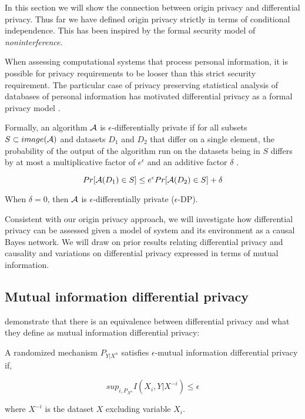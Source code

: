 \documentclass[../thesis.tex]{subfiles}
\begin{document}
In this section we will show the connection between
origin privacy and differential privacy.
Thus far we have defined origin privacy strictly in
terms of conditional independence.
This has been inspired by the formal security model
of \emph{noninterference}.

When assessing computational systems that process
personal information, it is possible for privacy
requirements to be looser than this strict security
requirement.
The particular case of privacy preserving statistical
analysis of databases of personal information has
motivated differential privacy as a formal privacy
model \cite{dwork06icalp,dwork08jpc}. 

Formally, an algorithm $\mathcal{A}$ is $\epsilon$-differentially private
if for all subsets $S \subset image(\mathcal{A})$ and
datasets $D_1$ and $D_2$ that differ on a single element,
the probability of the output of the algorithm run
on the datasets being in $S$ differs by at most a
multiplicative factor of $e^\epsilon$ and an additive
factor $\delta$ \cite{dwork2014algorithmic}. 

\begin{dfn}
$$Pr[\mathcal{A}(D_1) \in S] \leq e^\epsilon Pr[\mathcal{A}(D_2) \in S] + \delta$$
\end{dfn}

When $\delta = 0$, then $\mathcal{A}$ is $\epsilon$-differentially
private ($\epsilon$-DP).

Consistent with our origin privacy approach, we will
investigate how differential privacy can be assessed
given a model of system and its environment as a
causal Bayes network.
We will draw on prior results relating differential
privacy and causality and variations on differential
privacy expressed in terms of mutual information.

\subsection{Mutual information differential privacy}

\citet{cuff2016differential} demonstrate that there is
an equivalence between differential privacy and what they define
as mutual information differential privacy:

\begin{dfn}
  A randomized mechanism $P_{Y \vert X^n}$ satisfies $\epsilon$-mutual
  information differential privacy if,

  $$sup_{i, P_{X^n}} I(X_i, Y \vert X^{-i}) \leq \epsilon$$

  where $X^{-i}$ is the dataset $X$ excluding variable
  $X_i$.
\end{dfn}
\end{document}
